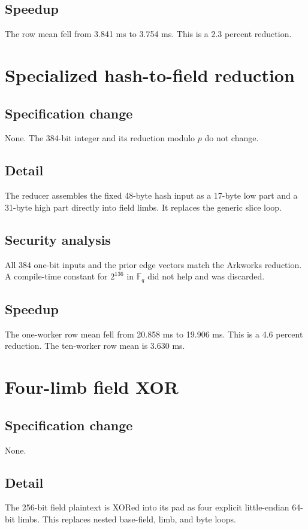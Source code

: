 \documentclass[10pt]{article}
\begin{document}
\subsection{Speedup}
The row mean fell from 3.841 ms to 3.754 ms.
This is a 2.3 percent reduction.

\section{Specialized hash-to-field reduction}
\label{sec:o7}

\subsection{Specification change}
None.
The 384-bit integer and its reduction modulo $p$ do not change.

\subsection{Detail}
The reducer assembles the fixed 48-byte hash input as a 17-byte low part and a 31-byte high part directly into field limbs.
It replaces the generic slice loop.

\subsection{Security analysis}
All 384 one-bit inputs and the prior edge vectors match the Arkworks reduction.
A compile-time constant for $2^{136}$ in $\mathbb{F}_q$ did not help and was discarded.

\subsection{Speedup}
The one-worker row mean fell from 20.858 ms to 19.906 ms.
This is a 4.6 percent reduction.
The ten-worker row mean is 3.630 ms.

\section{Four-limb field XOR}
\label{sec:o8}

\subsection{Specification change}
None.

\subsection{Detail}
The 256-bit field plaintext is XORed into its pad as four explicit little-endian 64-bit limbs.
This replaces nested base-field, limb, and byte loops.
\end{document}
